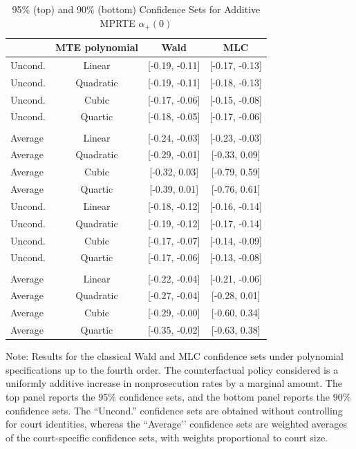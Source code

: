 \documentclass[11pt]{article}
\theoremstyle{definition}
\newcommand{\0}{\ensuremath{\mathbf{0}}}
\begin{document}
\begin{bibunit}
%
\begin{table}[h!]
  \centering
	\caption{95\% (top) and 90\% (bottom) Confidence Sets for Additive MPRTE ${\alpha}_+(0)$}
  \begin{tabular}{lccc}
  \toprule 
		      &	MTE polynomial & Wald & MLC \\
		      \midrule
    Uncond.     & Linear & [-0.19, -0.11] & [-0.17, -0.13] \\
    Uncond.     & Quadratic & [-0.19, -0.11] & [-0.18, -0.13] \\
    Uncond.     & Cubic & [-0.17, -0.06] & [-0.15, -0.08] \\
    Uncond.     & Quartic & [-0.18, -0.05] & [-0.17, -0.06] \\
                &       &       &  \\
    Average     & Linear & [-0.24, -0.03] & [-0.23, -0.03] \\
    Average     & Quadratic & [-0.29, -0.01] & [-0.33, 0.09] \\
    Average     & Cubic & [-0.32, 0.03] & [-0.79, 0.59] \\
    Average     & Quartic & [-0.39, 0.01] & [-0.76, 0.61] \\
		      \midrule
    Uncond.     & Linear & [-0.18, -0.12] & [-0.16, -0.14] \\
    Uncond.     & Quadratic & [-0.19, -0.12] & [-0.17, -0.14] \\
    Uncond.     & Cubic & [-0.17, -0.07] & [-0.14, -0.09] \\
    Uncond.     & Quartic & [-0.17, -0.06] & [-0.13, -0.08] \\
                &       &       &  \\
    Average     & Linear & [-0.22, -0.04] & [-0.21, -0.06] \\
    Average     & Quadratic & [-0.27, -0.04] & [-0.28, 0.01] \\
    Average     & Cubic & [-0.29, -0.00] & [-0.60, 0.34] \\
    Average     & Quartic & [-0.35, -0.02] & [-0.63, 0.38] \\
		\bottomrule
	\end{tabular}
    
    \begin{tablenotes}
    \footnotesize \raggedright
      Note: {Results for the classical Wald and MLC confidence sets under polynomial specifications up to the fourth order. The counterfactual policy considered is a uniformly additive increase in nonprosecution rates by a marginal amount. The top panel reports the 95\% confidence sets, and the bottom panel reports the 90\% confidence sets. The “Uncond.” confidence sets are obtained without controlling for court identities, whereas the “Average’’ confidence sets are weighted averages of the court-specific confidence sets, with weights proportional to court size.}
    \end{tablenotes}
    \label{tab:Avg_A-MPRTE}
\end{table}




\end{bibunit}
\end{document}
